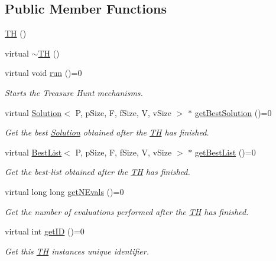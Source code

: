 \subsection*{Public Member Functions}
\begin{DoxyCompactItemize}
\item 
\hyperlink{classTH_acba01062c7278c1e5102a864d1c5fb8f}{TH} ()
\item 
virtual \hyperlink{classTH_a970d21b50c126516baf21d7d93ab1b41}{$\sim$\+TH} ()
\item 
virtual void \hyperlink{classTH_aa7b9b5ac83b57193d581f1bf1dfc7265}{run} ()=0
\begin{DoxyCompactList}\small\item\em Starts the Treasure Hunt mechanisms. \end{DoxyCompactList}\item 
virtual \hyperlink{classSolution}{Solution}$<$ P, p\+Size, F, f\+Size, V, v\+Size $>$ $\ast$ \hyperlink{classTH_a745d83b7c3f5abaac7daa5b04d4bfabe}{get\+Best\+Solution} ()=0
\begin{DoxyCompactList}\small\item\em Get the best \hyperlink{classSolution}{Solution} obtained after the \hyperlink{classTH}{TH} has finished. \end{DoxyCompactList}\item 
virtual \hyperlink{classBestList}{Best\+List}$<$ P, p\+Size, F, f\+Size, V, v\+Size $>$ $\ast$ \hyperlink{classTH_ab7a4c280d39eb1e5cf3bf169dbe83b64}{get\+Best\+List} ()=0
\begin{DoxyCompactList}\small\item\em Get the best-\/list obtained after the \hyperlink{classTH}{TH} has finished. \end{DoxyCompactList}\item 
virtual long long \hyperlink{classTH_a1ae2252ee4a5afad845aac1b49ff1e31}{get\+N\+Evals} ()=0
\begin{DoxyCompactList}\small\item\em Get the number of evaluations performed after the \hyperlink{classTH}{TH} has finished. \end{DoxyCompactList}\item 
virtual int \hyperlink{classTH_a7746a718f28ab3128bb03490cdcbb152}{get\+ID} ()=0
\begin{DoxyCompactList}\small\item\em Get this \hyperlink{classTH}{TH} instance\textquotesingle{}s unique identifier. \end{DoxyCompactList}\end{DoxyCompactItemize}


